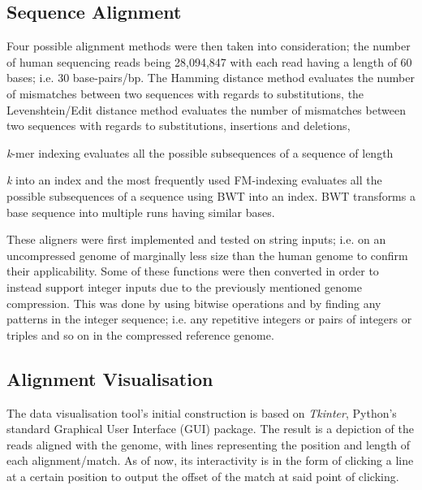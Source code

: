 \documentclass{csfyp}
\begin{document}
\subsection{Sequence Alignment}\vspace{-2ex}
Four possible alignment methods were then taken into consideration; the number of human sequencing reads being 28,094,847 with each read having a length of 60 bases; i.e. 30 base-pairs/bp.  The Hamming distance method evaluates the number of mismatches between two sequences with regards to substitutions,  the Levenshtein/Edit distance method evaluates the number of mismatches between two sequences with regards to substitutions, insertions and deletions,  {\textit{k}-mer indexing evaluates all the possible subsequences of a sequence of length {\textit{k} into an index and the most frequently used FM-indexing evaluates all the possible subsequences of a sequence using BWT into an index.  BWT transforms a base sequence into multiple runs having similar bases.  

These aligners were first implemented and tested on string inputs; i.e. on an uncompressed genome of marginally less size than the human genome to confirm their applicability.  Some of these functions were then converted in order to instead support integer inputs due to the previously mentioned genome compression.  This was done by using bitwise operations and by finding any patterns in the integer sequence; i.e. any repetitive integers or pairs of integers or triples and so on in the compressed reference genome.        

\subsection{Alignment Visualisation}\vspace{-2ex}
The data visualisation tool's initial construction is based on {\textit{Tkinter}}, Python's standard Graphical User Interface (GUI) package.  The result is a depiction of the reads aligned with the genome, with lines representing the position and length of each alignment/match.  As of now, its interactivity is in the form of clicking a line at a certain position to output the offset of the match at said point of clicking.     

}}
\end{document}
